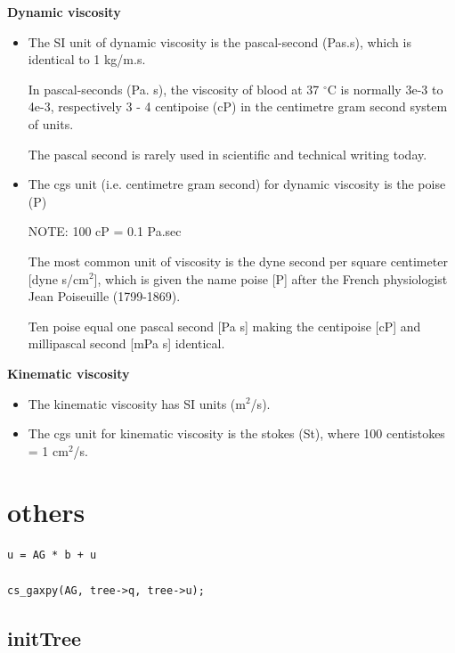 {\bf Dynamic viscosity}
\begin{itemize}
  \item  The SI unit of dynamic viscosity is the pascal-second (Pas.s), which is identical
to 1 kg/m.s.

In pascal-seconds (Pa. s), the viscosity of blood at 37 $^\circ$C is normally 3e-3
to 4e-3, respectively 3 - 4 centipoise (cP) in the centimetre gram second
system of units.

 The pascal second is rarely used in scientific and technical writing today. 


  \item The cgs unit (i.e. centimetre gram second) for dynamic viscosity is the
  poise (P)
  
NOTE: 100 cP = 0.1 Pa.sec

The most common unit of viscosity is the dyne second per square centimeter [dyne
s/cm$^2$], which is given the name poise [P] after the French physiologist Jean
Poiseuille (1799-1869).

Ten poise equal one pascal second [Pa s] making the centipoise [cP] and
millipascal second [mPa s] identical. 
\end{itemize}

{\bf Kinematic viscosity}
\begin{itemize}
  \item   The kinematic viscosity has SI units (m$^2$/s).
  
  \item The cgs unit for kinematic viscosity is the stokes (St), where 100
  centistokes = 1 cm$^2$/s.
\end{itemize}


\section{others}

\begin{verbatim}
u = AG * b + u 

cs_gaxpy(AG, tree->q, tree->u);
\end{verbatim}

\subsection{initTree}
\label{sec:initTree-Htree}


